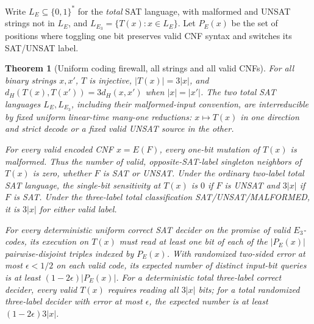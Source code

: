 \documentclass[11pt]{article}
\newtheorem{theorem}{Theorem}
\begin{document}
Write \(L_E\subseteq\{0,1\}^*\) for the \emph{total} SAT language, with malformed and UNSAT strings not in \(L_E\), and \(L_{E_3}=\{T(x):x\in L_E\}\). Let \(P_E(x)\) be the set of positions where toggling one bit preserves valid CNF syntax and switches its SAT/UNSAT label.

\begin{theorem}[Uniform coding firewall, all strings and all valid CNFs]
For all binary strings \(x,x'\), \(T\) is injective, \(|T(x)|=3|x|\), and \(d_H(T(x),T(x'))=3d_H(x,x')\) when \(|x|=|x'|\). The two total SAT languages \(L_E,L_{E_3}\), including their malformed-input convention, are interreducible by \emph{fixed uniform linear-time} many-one reductions: \(x\mapsto T(x)\) in one direction and strict decode or a fixed valid UNSAT source in the other.

For every valid encoded CNF \(x=E(F)\), \emph{every} one-bit mutation of \(T(x)\) is malformed. Thus the number of valid, opposite-SAT-label singleton neighbors of \(T(x)\) is zero, whether \(F\) is SAT or UNSAT. Under the ordinary two-label total SAT language, the single-bit sensitivity at \(T(x)\) is \(0\) if \(F\) is UNSAT and \(3|x|\) if \(F\) is SAT. Under the \emph{three-label} total classification SAT/UNSAT/MALFORMED, it is \(3|x|\) for either valid label.

For every deterministic uniform correct SAT decider on the \emph{promise of valid} \(E_3\)-codes, its execution on \(T(x)\) must read at least one bit of each of the \(|P_E(x)|\) pairwise-disjoint triples indexed by \(P_E(x)\). With randomized two-sided error at most \(\epsilon<1/2\) on each valid code, its expected number of distinct input-bit queries is at least \((1-2\epsilon)|P_E(x)|\). For a deterministic \emph{total three-label} correct decider, every valid \(T(x)\) requires reading all \(3|x|\) bits; for a total randomized three-label decider with error at most \(\epsilon\), the expected number is at least \((1-2\epsilon)3|x|\).
\end{theorem}
\end{document}
